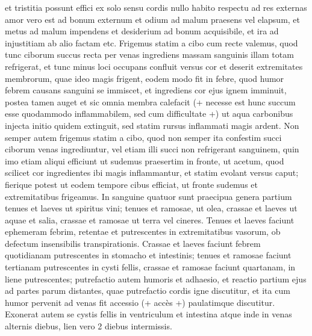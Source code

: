 \pstart
{}
et tristitia possunt effici ex solo sensu cordis nullo habito respectu ad res externas amor vero est ad bonum externum et odium ad malum praesens vel elapsum,
et metus ad malum impendens et desiderium ad bonum acquisibile, et ira ad injustitiam ab alio factam etc.
\pend%
\pstart%
Frigemus%
statim a cibo cum recte valemus,
quod tunc ciborum succus recta per venas ingrediens massam sanguinis illam totam refrigerat,
et tunc minus loci occupans confluit versus cor et deserit extremitates membrorum, quae ideo magis frigent,
eodem modo fit in febre, quod humor febrem causans sanguini se immiscet,
et ingrediens cor ejus ignem imminuit, postea tamen auget et sic omnia membra calefacit
(+ necesse est hunc succum esse quodammodo inflammabilem, sed cum difficultate +)
ut aqua carbonibus injecta initio quidem extinguit, sed statim rursus inflammati magis ardent.
Non semper autem frigemus statim a cibo, quod non semper ita confestim succi ciborum venas ingrediuntur,
vel etiam illi succi non refrigerant sanguinem,
quin imo etiam aliqui efficiunt ut sudemus praesertim in fronte, ut acetum,
quod scilicet cor ingredientes ibi magis inflammantur, et statim evolant versus caput;
fierique potest ut eodem tempore cibus efficiat, ut fronte sudemus et extremitatibus frigeamus.
\pend%
\pstart%
In sanguine quatuor sunt praecipua genera partium tenues et laeves ut spiritus vini;
tenues et ramosae, ut olea, crassae et laeves ut aquae et salia, crassae et ramosae ut terra vel cineres.
Tenues et laeves faciunt ephemeram febrim, retentae et putrescentes in extremitatibus vasorum, ob defectum insensibilis transpirationis.
Crassae et laeves faciunt febrem quotidianam putrescentes in stomacho et intestinis;
tenues et ramosae faciunt tertianam putrescentes in cysti fellis, crassae et ramosae faciunt quartanam, in liene putrescentes;
putrefactio autem humoris et adhaesio,
et reactio partium ejus ad partes parum distantes, quae putrefactio cordis igne discutitur,
et ita cum humor pervenit ad venas fit accessio (+ acc\`{e}s +) paulatimque discutitur.
Exonerat autem se cystis fellis in ventriculum et intestina atque inde in venas alternis diebus, lien vero 2 diebus intermissis.%
